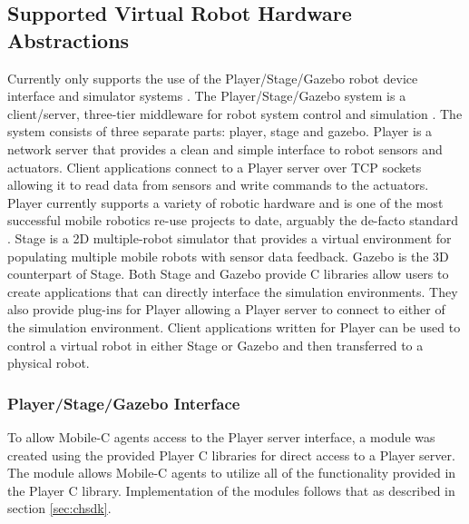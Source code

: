     \subsection{Supported Virtual Robot Hardware Abstractions}
      Currently only supports the use of the Player/Stage/Gazebo robot device
        interface and simulator systems 
        \cite{Collett2005,Gerkey2001b,PlayerStage_Website}.
      The Player/Stage/Gazebo system is a client/server, three-tier middleware for 
        robot system control and simulation \cite{Collett2005,Gerkey2001b}.
      The system consists of three separate parts: player, stage and gazebo.
      Player is a network server that provides a clean and simple interface
        to robot sensors and actuators.
      Client applications connect to a Player server over TCP sockets allowing it
        to read data from sensors and write commands to the actuators.
      Player currently supports a variety of robotic hardware and is one of the 
        most successful mobile robotics re-use projects to date, arguably the 
        de-facto standard \cite{Makarenko2006}.
      Stage is a 2D multiple-robot simulator that provides a virtual environment
        for populating multiple mobile robots with sensor data feedback.
      Gazebo is the 3D counterpart of Stage.
      Both Stage and Gazebo provide C libraries allow users to create applications
        that can directly interface the simulation environments.
      They also provide plug-ins for Player allowing a Player server to connect
        to either of the simulation environment.
      Client applications written for Player can be used to control a virtual
        robot in either Stage or Gazebo and then transferred to a physical robot.

      \subsubsection{Player/Stage/Gazebo Interface}
        To allow Mobile-C agents access to the Player server interface, a module
          was created using the provided Player C libraries for direct access to 
          a Player server.
        The module allows Mobile-C agents to utilize all of the functionality
          provided in the Player C library.
        Implementation of the modules follows that as described in section 
          \ref{sec:chsdk}.

